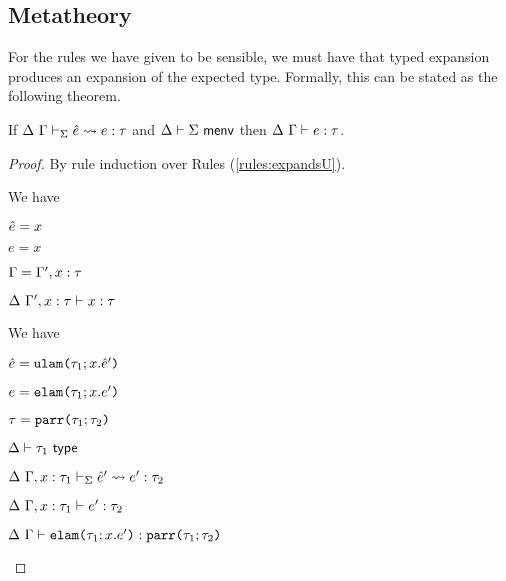 \subsection{Metatheory}
For the rules we have given to be sensible, we must have that typed expansion produces an expansion of the expected type. Formally, this can be stated as the following theorem.

\begin{theorem}\label{thm:typed-expansion-U}
If $\Delta~\Gamma \vdash_{\Sigma} \hat{e} \leadsto e : \tau$ and $\Delta \vdash \Sigma~\mathsf{menv}$ then $\Delta~\Gamma \vdash e : \tau$. 
\end{theorem}
\begin{proof}
By rule induction over Rules (\ref{rules:expandsU}).
\begin{byCases}
\item[\text{(\ref{rule:expandsU-var})}] We have
\begin{pfsteps*}
  \item $\hat{e}=x$ 
  \item $e=x$ 
  \item $\Gamma=\Gamma', x : \tau$ 
  \item $\Delta~\Gamma', x : \tau \vdash x : \tau$ 
\end{pfsteps*}
\resetpfcounter

\item[\text{(\ref{rule:expandsU-lam})}] We have 
\begin{pfsteps*}
  \item $\hat{e}=\texttt{ulam}\texttt{(}\tau_1; x.\hat{e}'\texttt{)}$ 
  \item $e=\texttt{elam}\texttt{(}\tau_1; x.e'\texttt{)}$ 
  \item $\tau=\texttt{parr}\texttt{(}\tau_1; \tau_2\texttt{)}$ 
  \item $\Delta \vdash \tau_1~\mathsf{type}$  
  \item $\Delta~\Gamma, x : \tau_1 \vdash_{\Sigma} \hat{e}' \leadsto e' : \tau_2$  
  \item $\Delta~\Gamma, x : \tau_1 \vdash e' : \tau_2$  \label{hastypeU}
  \item $\Delta~\Gamma \vdash \texttt{elam}\texttt{(}\tau_1; x.e'\texttt{)} : \texttt{parr}\texttt{(}\tau_1; \tau_2\texttt{)}$ 
\end{pfsteps*}
\resetpfcounter


\end{byCases}
\end{proof}
